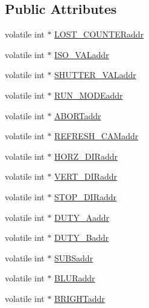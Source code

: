 \subsection*{Public Attributes}
\begin{DoxyCompactItemize}
\item 
volatile int $\ast$ \hyperlink{structval__addresses_a0eb119cb562c1ab4a3d68e513d439fcd}{L\+O\+S\+T\+\_\+\+C\+O\+U\+N\+T\+E\+Raddr}
\item 
volatile int $\ast$ \hyperlink{structval__addresses_a5a5f6d9a976602675639458fa735c845}{I\+S\+O\+\_\+\+V\+A\+Laddr}
\item 
volatile int $\ast$ \hyperlink{structval__addresses_a57ee2cd54ae492b38aae06975b64b0e2}{S\+H\+U\+T\+T\+E\+R\+\_\+\+V\+A\+Laddr}
\item 
volatile int $\ast$ \hyperlink{structval__addresses_aae5779146fa4fb188bb9572c20d5da4a}{R\+U\+N\+\_\+\+M\+O\+D\+Eaddr}
\item 
volatile int $\ast$ \hyperlink{structval__addresses_a0fe118a58a06a6f24181c13f97962e26}{A\+B\+O\+R\+Taddr}
\item 
volatile int $\ast$ \hyperlink{structval__addresses_a9da32da59ec29598d672ad09003491fd}{R\+E\+F\+R\+E\+S\+H\+\_\+\+C\+A\+Maddr}
\item 
volatile int $\ast$ \hyperlink{structval__addresses_aaa663924337345adb7b14897d1e7d1a5}{H\+O\+R\+Z\+\_\+\+D\+I\+Raddr}
\item 
volatile int $\ast$ \hyperlink{structval__addresses_a0bc3ea6915b32a17b4c333b865c81ea9}{V\+E\+R\+T\+\_\+\+D\+I\+Raddr}
\item 
volatile int $\ast$ \hyperlink{structval__addresses_ae9ae522d433f333dbb15a1ed5ebe70e6}{S\+T\+O\+P\+\_\+\+D\+I\+Raddr}
\item 
volatile int $\ast$ \hyperlink{structval__addresses_aadc43e056f0b10d3c772bd0ed45ae5bc}{D\+U\+T\+Y\+\_\+\+Aaddr}
\item 
volatile int $\ast$ \hyperlink{structval__addresses_a3bb48724a49aba39d68249e4714f731c}{D\+U\+T\+Y\+\_\+\+Baddr}
\item 
volatile int $\ast$ \hyperlink{structval__addresses_a2dc7beaca139f55cee0def0170611e03}{S\+U\+B\+Saddr}
\item 
volatile int $\ast$ \hyperlink{structval__addresses_a09b67aa417beb6f5592192cb7a54de2a}{B\+L\+U\+Raddr}
\item 
volatile int $\ast$ \hyperlink{structval__addresses_a6eaa61e0b52e12b72dd17ff8bdaa2ac5}{B\+R\+I\+G\+H\+Taddr}
\end{DoxyCompactItemize}


